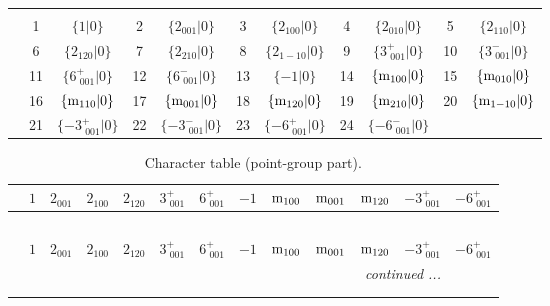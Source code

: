 \documentclass[fleqn,10pt,landscape]{article}
\begin{document}
\begin{itemize}
\begin{center}
\begin{longtable}{c|cc|cc|cc|cc|cc}
 \hline \hline
\multicolumn{10}{r}{} \\ \endlastfoot

 & 1 & $\{1|0\}$ & 2 & $\{2{}_{001}|0\}$ & 3 & $\{2{}_{100}|0\}$ & 4 & $\{2{}_{010}|0\}$ & 5 & $\{2{}_{110}|0\}$ \\
& 6 & $\{2{}_{120}|0\}$ & 7 & $\{2{}_{210}|0\}$ & 8 & $\{2{}_{1-10}|0\}$ & 9 & $\{3^{+}_{\,\,001}|0\}$ & 10 & $\{3^{-}_{\,\,001}|0\}$ \\
& 11 & $\{6^{+}_{\,\,001}|0\}$ & 12 & $\{6^{-}_{\,\,001}|0\}$ & 13 & $\{-1|0\}$ & 14 & $\{{\rm m}_{100}|0\}$ & 15 & $\{{\rm m}_{010}|0\}$ \\
& 16 & $\{{\rm m}_{110}|0\}$ & 17 & $\{{\rm m}_{001}|0\}$ & 18 & $\{{\rm m}_{120}|0\}$ & 19 & $\{{\rm m}_{210}|0\}$ & 20 & $\{{\rm m}_{1-10}|0\}$ \\
& 21 & $\{-3^{+}_{\,\,001}|0\}$ & 22 & $\{-3^{-}_{\,\,001}|0\}$ & 23 & $\{-6^{+}_{\,\,001}|0\}$ & 24 & $\{-6^{-}_{\,\,001}|0\}$ &  &  \\
\end{longtable}
\end{center}
\begin{center}
\renewcommand{\arraystretch}{1.0}
\begin{longtable}{c|rrrrrrrrrrrr}
\caption{Character table (point-group part).}
 \\
 \hline \hline
 & $ 1 $ & $ 2{}_{001} $ & $ 2{}_{100} $ & $ 2{}_{120} $ & $ 3^{+}_{\,\,001} $ & $ 6^{+}_{\,\,001} $ & $ -1 $ & $ {\rm m}_{100} $ & $ {\rm m}_{001} $ & $ {\rm m}_{120} $ & $ -3^{+}_{\,\,001} $ & $ -6^{+}_{\,\,001} $ \\ \hline \endfirsthead

\multicolumn{12}{l}{\tablename\ \thetable{}} \\
 \hline \hline
 & $ 1 $ & $ 2{}_{001} $ & $ 2{}_{100} $ & $ 2{}_{120} $ & $ 3^{+}_{\,\,001} $ & $ 6^{+}_{\,\,001} $ & $ -1 $ & $ {\rm m}_{100} $ & $ {\rm m}_{001} $ & $ {\rm m}_{120} $ & $ -3^{+}_{\,\,001} $ & $ -6^{+}_{\,\,001} $ \\ \hline \endhead

 \hline \hline
\multicolumn{12}{r}{\footnotesize\it continued ...} \\ \endfoot

 \hline \hline
\multicolumn{12}{r}{} \\ \endlastfoot


\end{longtable}
\end{center}
\end{itemize}
\end{document}
